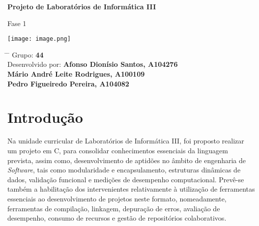 \documentclass[12pt,a4paper]{article}
\title{}
\author{}
\date{}
\begin{document}
	
	\newcommand{\subf}[2]{%
		{\small\begin{tabular}[t]{@{}c@{}}
				#1\\#2
		\end{tabular}}%
	}
	
	\begin{titlepage}
		\begin{center}
			\vspace*{3cm}
   
			\Huge
			\textbf{Projeto de Laboratórios de Informática III}
			\vspace{0.3cm}
			\Huge
   
			Fase 1
			\vspace{0.8cm}
   
			\large
			\vspace{1.5cm}
			\LARGE
			\vspace{1.5cm}
			\textbf{}
            \texttt{[image: image.png]}
			\vfill
			\vspace{1.0cm}
			\Large
			
		\end{center}
		\Large
		\begin{tabbing}
			\hspace*{1em}\= \hspace*{8em} \= \kill %
            \> Grupo: \textbf{44} \\
			\> Desenvolvido por: \textbf{Afonso Dionísio Santos, A104276} \\
            \>\>\textbf{Mário André Leite Rodrigues, A100109} \\
            \>\>\textbf{Pedro Figueiredo Pereira, A104082} \\
			
		\end{tabbing}
		
	\end{titlepage}
	
	\tableofcontents
	\newpage
    \section{Introdução}
    \hspace{0,6cm}Na unidade curricular de Laboratórios de Informática III, foi proposto realizar um projeto em C, para consolidar conhecimentos essenciais da linguagem prevista, assim como, desenvolvimento de aptidões no âmbito de engenharia de \textit{Software}, tais como modularidade e encapsulamento, estruturas dinâmicas de dados, validação funcional e medições de desempenho computacional. Prevê-se também a habilitação dos intervenientes relativamente à utilização de ferramentas essenciais ao desenvolvimento de projetos neste formato, nomeadamente, ferramentas de compilação, linkagem, depuração de erros, avaliação de desempenho, consumo de recursos e gestão de repositórios colaborativos. \\
        
\end{document}

